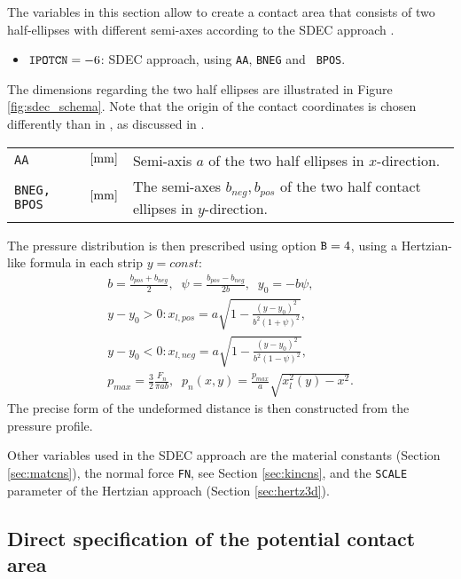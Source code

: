 \documentclass[12pt]{report}
\newenvironment{inputvars}{\vspace{0.4\baselineskip}%

\begin{tabular}{>{\raggedright}p{22mm}p{19mm}p{113mm}}}{
\end{tabular}

}
\newcommand{\inpvar}[3]{{\small\tt #1} & $#2$ & #3 \\[1ex]}
\begin{document}
The variables in this section allow to create a contact area that consists
of two half-ellipses with different semi-axes according to the SDEC
approach \cite{Piotrowski2017}. 
\begin{itemize}
\item ${\tt IPOTCN}=-6$: SDEC approach, using {\tt AA}, {\tt BNEG} and {\tt
        BPOS}.
\end{itemize}
The dimensions regarding the two half ellipses are illustrated in Figure
\ref{fig:sdec_schema}. Note that the origin of the contact coordinates is
chosen differently than in \cite{Piotrowski2017}, as discussed in
\cite{Vollebregt2018a-sdec}.
\begin{inputvars}
\inpvar{AA}{\bunit{mm}}{Semi-axis $a$ of the two half ellipses in $x$-direction.}
\inpvar{BNEG, BPOS}{\bunit{mm}}{The semi-axes $b_{neg},b_{pos}$ of the two half
        contact ellipses in $y$-direction.}
\end{inputvars}
The pressure distribution is then prescribed using option ${\tt B}=4$,
using a Hertzian-like formula in each strip $y=const$:
\begin{eqnarray}
   b = \frac{b_{pos}+b_{neg}}{2}, \;\;
   \psi = \frac{b_{pos} - b_{neg}}{2 b}, \;\;
   y_0 = - b \psi,  \\
   y-y_0 > 0: x_{l,pos} = 
                a \sqrt{ 1 - \frac{ (y-y_0)^2 }{ b^2 (1+\psi)^2 } }, \\
   y-y_0 < 0: x_{l,neg} = 
                a \sqrt{ 1 - \frac{ (y-y_0)^2 }{ b^2 (1-\psi)^2 } }, \\
   p_{max} = \frac{3}{2} \frac{F_n}{ \pi ab}, \;\;
   p_n(x,y) = \frac{p_{max}}{a} \sqrt{x^2_l(y) - x^2} .
\end{eqnarray}
The precise form of the undeformed distance is then constructed from the
pressure profile.

Other variables used in the SDEC approach are the material constants
(Section \ref{sec:matcns}), the normal force {\tt FN}, see Section
\ref{sec:kincns}, and the {\tt SCALE} parameter of the Hertzian approach
(Section \ref{sec:hertz3d}).

\subsection{Direct specification of the potential contact area}
\label{sec:nonhzvar}
\end{document}
